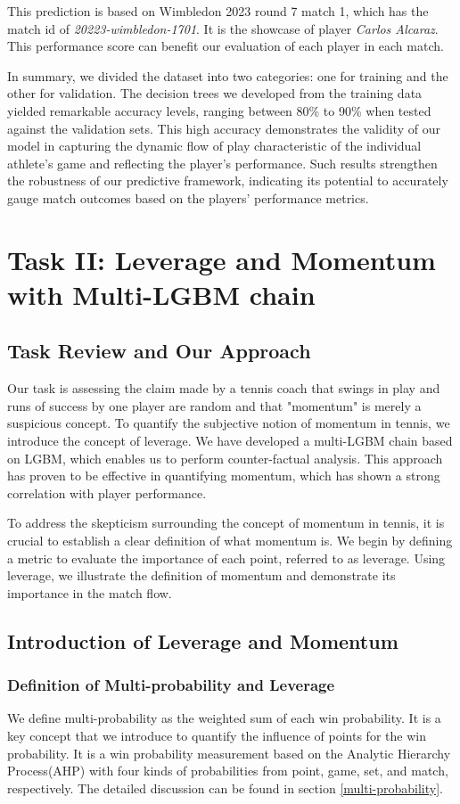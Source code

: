 \documentclass{mcmthesis}
\begin{document}
This prediction is based on Wimbledon 2023 round 7 match 1, which has the match id of \emph{20223-wimbledon-1701}. It is the showcase of player \emph{Carlos Alcaraz}. This performance score can benefit our evaluation of each player in each match.

In summary, we divided the dataset into two categories: one for training and the other for validation. The decision trees we developed from the training data yielded remarkable accuracy levels, ranging between 80\% to 90\% when tested against the validation sets. This high accuracy demonstrates the validity of our model in capturing the dynamic flow of play characteristic of the individual athlete's game and reflecting the player's performance. Such results strengthen the robustness of our predictive framework, indicating its potential to accurately gauge match outcomes based on the players' performance metrics.

\section{Task II: Leverage and Momentum with Multi-LGBM chain}
\subsection{Task Review and Our Approach}
Our task is assessing the claim made by a tennis coach that swings in play and runs of success by one player are random and that "momentum" is merely a suspicious concept. To quantify the subjective notion of momentum in tennis, we introduce the concept of leverage. We have developed a multi-LGBM chain based on LGBM, which enables us to perform counter-factual analysis. This approach has proven to be effective in quantifying momentum, which has shown a strong correlation with player performance.

To address the skepticism surrounding the concept of momentum in tennis, it is crucial to establish a clear definition of what momentum is. We begin by defining a metric to evaluate the importance of each point, referred to as leverage. Using leverage, we illustrate the definition of momentum and demonstrate its importance in the match flow.

\subsection{Introduction of Leverage and Momentum}
\subsubsection{Definition of Multi-probability and Leverage}
\label{leverage}
We define multi-probability as the weighted sum of each win probability. It is a key concept that we introduce to quantify the influence of points for the win probability. It is a  win probability measurement based on the Analytic Hierarchy Process(AHP)  with four kinds of probabilities from point, game, set, and match, respectively. The detailed discussion can be found in section \ref{multi-probability}.
\end{document}
